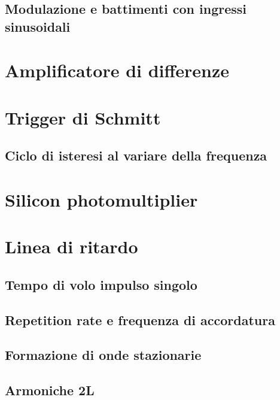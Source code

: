 \documentclass[journal]{IEEEtran}
\begin{document}
\subsection{Modulazione e battimenti con ingressi sinusoidali}


\section{Amplificatore di differenze} %


\section{Trigger di Schmitt} %

\subsection{Ciclo di isteresi al variare della frequenza} %


\section{Silicon photomultiplier} %

\section{Linea di ritardo} %

\subsection{Tempo di volo impulso singolo}

\subsection{Repetition rate e frequenza di accordatura}

\subsection{Formazione di onde stazionarie}

\subsection{Armoniche 2L}
\end{document}
